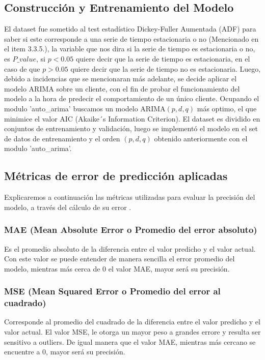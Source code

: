 \subsection{Construcción y Entrenamiento del Modelo}

El dataset fue sometido al test estadístico Dickey-Fuller Aumentada (ADF) para saber si este corresponde a una serie de tiempo estacionaria o no (Mencionado en el item 3.3.5.), la variable que nos dira si la serie de tiempo es estacionaria o no, es $P\_value$, si $p<0.05$ quiere decir que la serie de tiempo es estacionaria, en el caso de que $p>0.05$ quiere decir que la serie de tiempo no es estacionaria.
Luego, debido a incidencias que se mencionaran más adelante, se decide aplicar el modelo ARIMA sobre un cliente, con el fin de probar el funcionamiento del modelo a la hora de predecir el comportamiento de un único cliente. Ocupando el modulo 'auto\_arima' buscamos un modelo ARIMA$(p,d,q)$ más optimo, el que minimice el valor AIC (Akaike´s Information Criterion).
El dataset es dividido en conjuntos de entrenamiento y validación, luego se implementó el modelo en el set de datos de entrenamiento y el orden $(p,d,q)$ obtenido anteriormente con el modulo 'auto\_arima'.

\subsection{Métricas de error de predicción aplicadas}

Explicaremos a continuación las métricas utilizadas para evaluar la precisión del modelo, a través del cálculo de su error \cite{forecast-time-series-arima}.

\subsubsection{MAE (Mean Absolute Error o Promedio del error absoluto)}

Es el promedio absoluto de la diferencia entre el valor predicho y el valor actual. Con este valor se puede entender de manera sencilla el error promedio del modelo, mientras más cerca de 0 el valor MAE, mayor será su precisión.

\subsubsection{MSE (Mean Squared Error o Promedio del error al cuadrado)}

Corresponde al promedio del cuadrado de la diferencia entre el valor predicho y el valor actual. El valor MSE, le otorga un mayor peso a grandes errore y resulta ser sensitivo a outliers. De igual manera que el valor MAE, mientras más cercano se encuentre a 0, mayor será su precisión.

